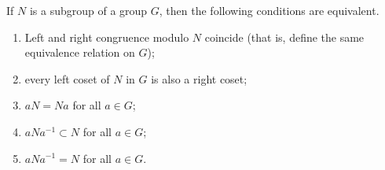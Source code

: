 \begin{theorem}
If $N$ is a subgroup of a group $G$, then the following conditions are equivalent.
\begin{enumerate}
    \item[(i)] Left and right congruence modulo $N$ coincide (that is, define the same equivalence relation on $G$);
    \item[(ii)] every left coset of $N$ in $G$ is also a right coset;
    \item[(iii)] $aN = Na$ for all $a \in G$;
    \item[(iv)] $aNa^{-1} \subset N$ for all $a \in G$;
    \item[(v)] $aNa^{-1} = N$ for all $a \in G$.
\end{enumerate}
\end{theorem}
